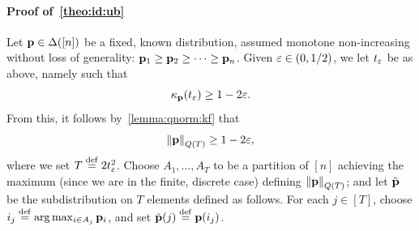 \paragraph{Proof of~\cref{theo:id:ub}}

Let $\mathbf{p}\in\Delta\!\left([n]\right)$ be a fixed, known distribution, assumed monotone non-increasing without loss of generality: $\mathbf{p}_1\geq \mathbf{p}_2\geq\dots\geq \mathbf{p}_n$. Given $\varepsilon \in (0,1/2)$, we let $t_\varepsilon$ be as above, namely such that
\[
    \kappa_{\mathbf{p}}(t_\varepsilon) \geq 1-2\varepsilon.
\]
From this, it follows by~\cref{lemma:qnorm:kf} that
\begin{equation}\label{eq:ub:qt:norm}
    \lVert\mathbf{p}{\rVert}_{Q(T)} \geq 1-2\varepsilon,
\end{equation}
where we set $T\stackrel{\rm def}{=} 2t^2_\varepsilon$. Choose $A_1,\dots,A_T$ to be a partition of $[n]$ achieving the maximum (since we are in the finite, discrete case) defining $\lVert\mathbf{p}{\rVert}_{Q(T)}$; and let $\tilde{\mathbf{p}}$ be the subdistribution on $T$ elements defined as follows.
For each $j\in[T]$, choose $i_j \stackrel{\rm def}{=} \arg\max_{i\in A_j} \mathbf{p}_i$, and set $\tilde{\mathbf{p}}(j) \stackrel{\rm def}{=} \mathbf{p}(i_j)$.

